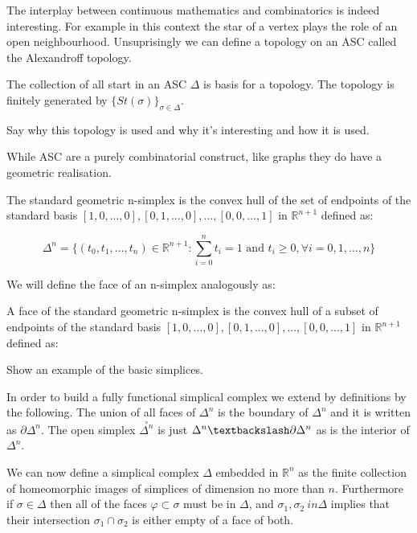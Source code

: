 The interplay between continuous mathematics and combinatorics is indeed interesting. For example in this context the star of a vertex plays the role of an open neighbourhood. Unsuprisingly we can define a topology on an ASC called the Alexandroff topology.


\begin{defn} The collection of all start in an ASC $\Delta$ is basis for a topology. The topology is finitely generated by $\{St(\sigma)\}_{\sigma \in \Delta}$.  \end{defn}

Say why this topology is used and why it's interesting and how it is used.

While ASC are a purely combinatorial construct, like graphs they do have a geometric realisation.

\begin{defn} The standard geometric n-simplex is the convex hull of the set of endpoints of the standard basis $[1, 0, ..., 0], [0, 1, ..., 0], ..., [0, 0, ..., 1]$ in $\mathbb{R}^{n+1}$ defined as: \end{defn}


$$ \Delta^n = \{(t_0, t_1, ..., t_n) \in \mathbb{R}^{n+1} : \sum_{i = 0}^{n} t_i  = 1 \text{ and } t_i \ge 0, \forall i = 0, 1, ..., n \} $$

We will define the face of an n-simplex analogously as:

\begin{defn} A face of the standard geometric n-simplex is the convex hull of a subset of endpoints of the standard basis $[1, 0, ..., 0], [0, 1, ..., 0], ..., [0, 0, ..., 1]$ in $\mathbb{R}^{n+1}$ defined as: \end{defn}

\begin{ex} Show an example of the basic simplices. \end{ex}



In order to build a fully functional simplical complex we extend by definitions by the following. The union of all faces of $\Delta^n$ is the boundary of $\Delta^n$ and it is written as $\partial \Delta^n$. The open simplex $\overset{\circ}{\Delta^n}$ is just $\Delta^n \textbackslash \partial \Delta^n$ as is the interior of $\Delta^n$.


We can now define a simplical complex $\Delta$ embedded in $\mathbb{R}^n$ as the finite collection of homeomorphic images of simplices of dimension no more than $n$. Furthermore if $\sigma \in \Delta$ then all of the faces $\varphi \subset \sigma$ must be in $\Delta$, and $\sigma_1, \sigma_2 \ in \Delta$ implies that their intersection $\sigma_1 \cap \sigma_2$ is either empty of a face of both.



